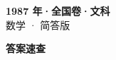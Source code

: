 \documentclass[zihao=-4, a4paper]{ctexart}
\begin{document}
\begin{center}
  {\Large\bfseries 1987 年·全国卷·文科}\\[4pt]
  {\large 数学 · 简答版}
\end{center}
\medskip
{}

\clearpage
{}
\begin{center}{\Large\bfseries 答案速查}\end{center}
\medskip

\end{document}

